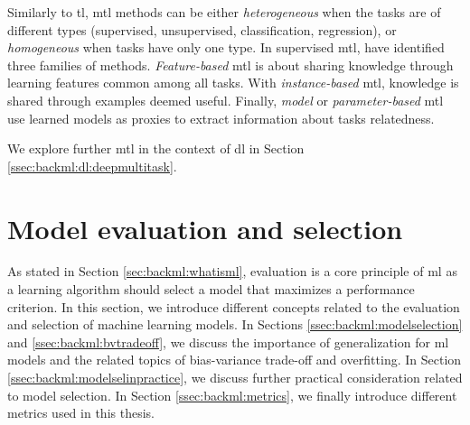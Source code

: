 Similarly to \acrlong{tl}, \acrlong{mtl} methods can be either \textit{heterogeneous}
when the tasks are of different types (\eg supervised, unsupervised, classification,
regression), or \textit{homogeneous} when tasks have only one type. In supervised
\acrlong{mtl}, \citeauthor{zhang2017survey} \cite{zhang2017survey} have identified three families of
methods. \textit{Feature-based} \acrlong{mtl} is about sharing knowledge through
learning features common among all tasks. With \textit{instance-based} \acrlong{mtl},
knowledge is shared through examples deemed useful. Finally, \textit{model} or
\textit{parameter-based} \acrlong{mtl} use learned models as proxies to extract
information about tasks relatedness.

We explore further \acrlong{mtl} in the context of \acrlong{dl} in Section
\ref{ssec:backml:dl:deepmultitask}.


\section{Model evaluation and selection}
\label{sec:backml:modeleval}

As stated in Section \ref{sec:backml:whatisml}, evaluation is a core principle of
\acrlong{ml} as a learning algorithm should select a model that maximizes a
performance criterion. In this section, we introduce different concepts related
to the evaluation and selection of machine learning models. In Sections
\ref{ssec:backml:modelselection} and \ref{ssec:backml:bvtradeoff}, we discuss the
importance of generalization for \acrlong{ml} models and the related topics of
bias-variance trade-off and overfitting. In Section \ref{ssec:backml:modelselinpractice},
we discuss further practical consideration related to model selection. In Section
\ref{ssec:backml:metrics}, we finally introduce different metrics used in this
thesis.


